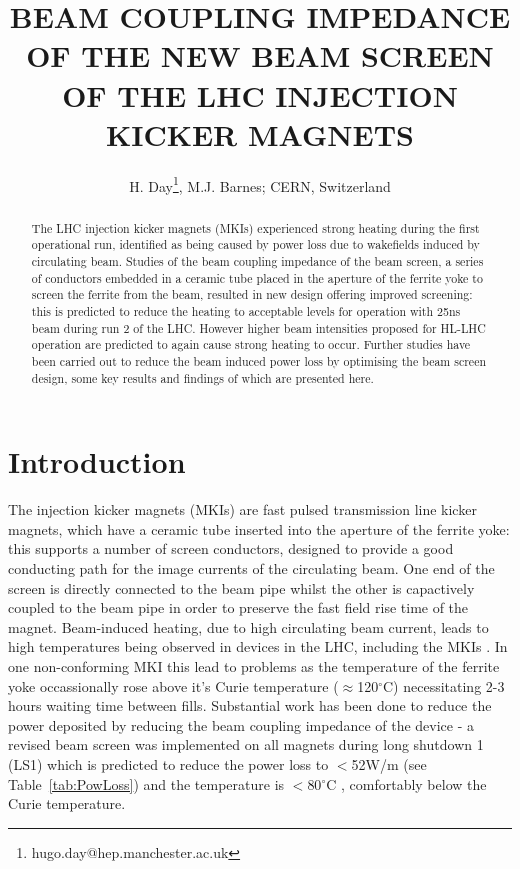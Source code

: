 \documentclass[a4paper,
              ]{jacow}
\begin{document}
\title{BEAM COUPLING IMPEDANCE OF THE NEW BEAM SCREEN OF THE LHC INJECTION KICKER MAGNETS}
\author{H. Day\thanks{hugo.day@hep.manchester.ac.uk}, M.J. Barnes;  CERN, Switzerland}

\maketitle 


\begin{abstract}
The LHC injection kicker magnets (MKIs) experienced strong heating during the first operational run, identified as being caused by power loss due to wakefields induced by circulating beam. Studies of the beam coupling impedance of the beam screen, a series of conductors embedded in a ceramic tube placed in the aperture of the ferrite yoke to screen the ferrite from the beam, resulted in new design offering improved screening: this is predicted to reduce the heating to acceptable levels for operation with 25ns beam during run 2 of the LHC. However higher beam intensities proposed for HL-LHC operation are predicted to again cause strong heating to occur. Further studies have been carried out to reduce the beam induced power loss by optimising the beam screen design, some key results and findings of which are presented here.
\end{abstract}

\section{Introduction}

The injection kicker magnets (MKIs) are fast pulsed transmission line kicker magnets, which have a ceramic tube inserted into the aperture of the ferrite yoke: this supports a number of screen conductors, designed to provide a good conducting path for the image currents of the circulating beam. One end of the screen is directly connected to the beam pipe whilst the other is capactively coupled to the beam pipe in order to preserve the fast field rise time of the magnet. Beam-induced heating, due to high circulating beam current, leads to high temperatures being observed in devices in the LHC, including the MKIs \cite{mki-heatingTemp}. In one non-conforming MKI this lead to problems as the temperature of the ferrite yoke occassionally rose above it's Curie temperature ($\approx$120$^{\circ}$C) necessitating 2-3 hours waiting time between fills. Substantial work has been done to reduce the power deposited by reducing the beam coupling impedance of the device - a revised beam screen was implemented on all magnets during long shutdown 1 (LS1) which is predicted to reduce the power loss to $<$52W/m (see Table~\ref{tab:PowLoss}) and the temperature is $<$80$^{\circ}$C \cite{lorenaStrat}, comfortably below the Curie temperature. 
\end{document}
